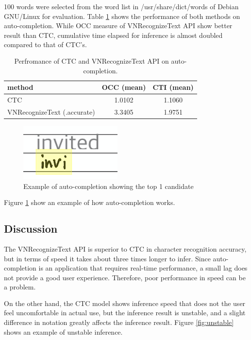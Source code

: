 100 words were selected from the word list in /usr/share/dict/words of Debian GNU/Linux for evaluation.
Table \ref{tab:metrics} shows the performance of both methods on auto-completion. While OCC measure of
VNRecognizeText API show better result than CTC, cumulative time elapsed for inference is almost doubled
compared to that of CTC's.

\begin{table}[htbp]
    \centering
    \begin{tabular}{|l||c|c|} \hline
    method & OCC (mean) & CTI (mean) \\ \hline \hline
    CTC & 1.0102 & 1.1060 \\ \hline
    VNRecognizeText (.accurate) & 3.3405 & 1.9751 \\ \hline
    \end{tabular}
    \caption{Perfromance of CTC and VNRecognizeText API on auto-completion.}
    \label{tab:metrics}
\end{table}

\begin{figure}
    \centering
    \includegraphics[]{images/auto-completion.png}
    \caption{Example of auto-completion showing the top 1 candidate}
    \label{fig:auto-complete}
\end{figure}

Figure \ref{fig:auto-complete} show an example of how auto-completion works.

\subsection{Discussion}

The VNRecognizeText API is superior to CTC in character recognition accuracy,
but in terms of speed it takes about three times longer to infer.
Since auto-completion is an application that requires real-time performance,
a small lag does not provide a good user experience. Therefore,
poor performance in speed can be a problem.

On the other hand, the CTC model shows inference speed that does not the user
feel uncomfortable in actual use, but the inference result is unstable,
and a slight difference in notation greatly affects the inference result.
Figure \ref{fig:unstable} shows an example of unstable inference.

